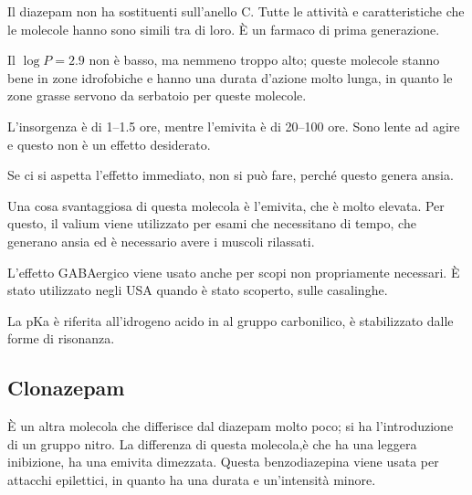 Il diazepam non ha sostituenti sull'anello C. Tutte le attività e
caratteristiche che le molecole hanno sono simili tra di loro. È un
farmaco di prima generazione.


Il $ \log{} P = 2.9$ non è basso, ma nemmeno troppo alto; queste molecole
stanno bene in zone idrofobiche e hanno una durata d'azione molto lunga,
in quanto le zone grasse servono da serbatoio per queste molecole.

L'insorgenza è di 1--1.5 ore, mentre l'emivita è di 20--100 ore. Sono lente 
ad agire e questo non è un effetto desiderato.

Se ci si aspetta l'effetto immediato, non si può fare, perché questo
genera ansia.

Una cosa svantaggiosa di questa molecola è l'emivita, che è molto
elevata. Per questo, il valium viene utilizzato per esami che
necessitano di tempo, che generano ansia ed è necessario avere i muscoli
rilassati.

L'effetto GABAergico viene usato anche per scopi non propriamente
necessari. È stato utilizzato negli USA quando è stato scoperto, sulle
casalinghe.



La pKa è riferita all'idrogeno acido in \alpha{} al gruppo carbonilico,
è stabilizzato dalle forme di risonanza.

\subsection{Clonazepam}

È un altra molecola che differisce dal diazepam molto poco; si ha
l'introduzione di un gruppo nitro. La differenza di questa molecola,è
che ha una leggera inibizione, ha una emivita dimezzata. Questa
benzodiazepina viene usata per attacchi epilettici, in quanto ha una
durata e un'intensità minore.


